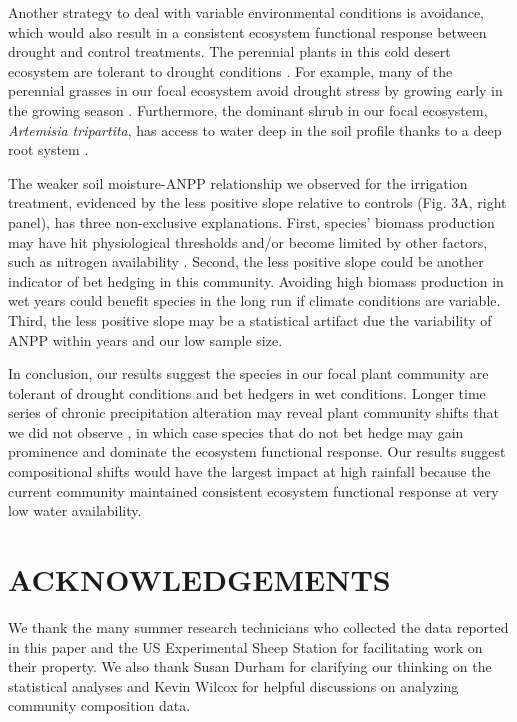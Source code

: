 \documentclass[fleqn,10pt,lineno]{wlpeerj} %
\begin{document}
Another strategy to deal with variable environmental conditions is
avoidance, which would also result in a consistent ecosystem functional
response between drought and control treatments. The perennial plants in
this cold desert ecosystem are tolerant to drought conditions
\citep[A.R. Kleinhesselink, unpublished data]{Bazzaz1979, Franks2011}.
For example, many of the perennial grasses in our focal ecosystem avoid
drought stress by growing early in the growing season \citep[A.R.
Kleinhesselink, personal observation]{Blaisdell1958}. Furthermore, the
dominant shrub in our focal ecosystem, \emph{Artemisia tripartita}, has
access to water deep in the soil profile thanks to a deep root system
\citep{Kulmatiski2017a}.

The weaker soil moisture-ANPP relationship we observed for the
irrigation treatment, evidenced by the less positive slope relative to
controls (Fig. 3A, right panel), has three non-exclusive explanations.
First, species' biomass production may have hit physiological thresholds
and/or become limited by other factors, such as nitrogen availability
\citep{LeBauer2008}.
Second, the less positive slope could be another indicator of bet
hedging in this community. Avoiding high biomass production in wet years
could benefit species in the long run if climate conditions are
variable. Third, the less positive slope may be a statistical artifact
due the variability of ANPP within years and our low sample size.

In conclusion, our results suggest the species in our focal plant
community are tolerant of drought conditions and bet hedgers in wet
conditions. Longer time series of chronic precipitation alteration may
reveal plant community shifts that we did not observe
\citep[e.g.,][]{Wilcox2016}, in which case species that do not bet hedge
may gain prominence and dominate the ecosystem functional response. Our
results suggest compositional shifts would have the largest impact at
high rainfall because the current community maintained consistent
ecosystem functional response at very low water availability.

\section{ACKNOWLEDGEMENTS}\label{acknowledgements}

We thank the many summer research technicians who collected the data
reported in this paper and the US Experimental Sheep Station for
facilitating work on their property. We also thank Susan Durham for
clarifying our thinking on the statistical analyses and Kevin Wilcox for
helpful discussions on analyzing community composition data.
\end{document}
